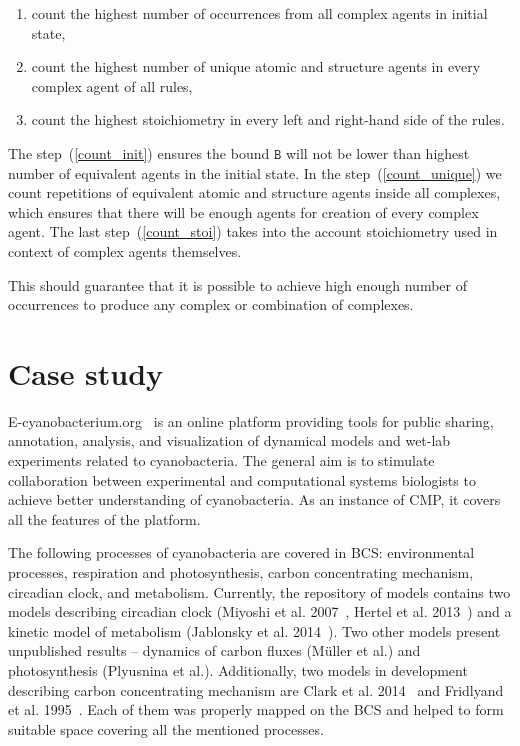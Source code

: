 \documentclass[12pt]{fithesis2}
\begin{document}
\begin{enumerate}
  \item \label{count_init} count the highest number of occurrences from all complex agents in initial state,
  \item \label{count_unique} count the highest number of unique atomic and structure agents in every complex agent of all rules,
  \item \label{count_stoi} count the highest stoichiometry in every left and right-hand side of the rules.
\end{enumerate}

The step~(\ref{count_init}) ensures the bound $\mathtt{B}$ will not be lower than highest number of equivalent agents in the initial state. In the step~(\ref{count_unique}) we count repetitions of equivalent atomic and structure agents inside all complexes, which ensures that there will be enough agents for creation of every complex agent. The last step~(\ref{count_stoi}) takes into the account stoichiometry used in context of complex agents themselves.

This should guarantee that it is possible to achieve high enough number of occurrences to produce any complex or combination of complexes.

\chapter{Case study}
\label{case_study}

E-cyanobacterium.org~\cite{Trojak2016} is an online platform providing tools for public sharing, annotation, analysis, and visualization of dynamical models and wet-lab experiments related to cyanobacteria. The general aim is to stimulate collaboration between experimental and computational systems biologists to achieve better understanding of cyanobacteria. As an instance of CMP, it covers all the features of the platform.

The following processes of cyanobacteria are covered in BCS: environmental processes, respiration and photosynthesis, carbon concentrating mechanism, circadian clock, and metabolism. Currently, the repository of models contains two models describing circadian clock (Miyoshi et al. 2007~\cite{Miyoshi01022007}, Hertel et al. 2013~\cite{Hertel2013}) and a kinetic model of metabolism (Jablonsky et al. 2014~\cite{Jablonsky2014}). Two other models present unpublished results -- dynamics of carbon fluxes (M\"{u}ller et al.) and photosynthesis (Plyusnina et al.). Additionally, two models in development describing carbon concentrating mechanism are Clark et al. 2014~\cite{clark2014insights} and Fridlyand et al. 1995~\cite{fridlyand1996quantitative}. Each of them was properly mapped on the BCS and helped to form suitable space covering all the mentioned processes.
\end{document}

